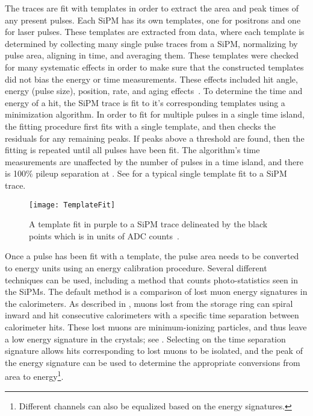 The traces are fit with templates in order to extract the area and peak times of any present pulses. Each SiPM has its own templates, one for positrons and one for laser pulses. These templates are extracted from data, where each template is determined by collecting many single pulse traces from a SiPM, normalizing by pulse area, aligning in time, and averaging them. These templates were checked for many systematic effects in order to make sure that the constructed templates did not bias the energy or time measurements. These effects included hit angle, energy (pulse size), position, rate, and aging effects~\cite{Kaspar:2016ofv,AFThesis}. To determine the time and energy of a hit, the SiPM trace is fit to it's corresponding templates using a \chisq minimization algorithm. In order to fit for multiple pulses in a single time island, the fitting procedure first fits with a single template, and then checks the residuals for any remaining peaks. If peaks above a threshold are found, then the fitting is repeated until all pulses have been fit. The algorithm's time measurements are unaffected by the number of pulses in a time island, and there is 100\% pileup separation at . See  for a typical single template fit to a SiPM trace.


\begin{figure}
    \centering
    \texttt{[image: TemplateFit]}
    \caption[Template fit to SiPM trace]{A template fit in purple to a SiPM trace delineated by the black points which is in units of ADC counts~\cite{AFThesis}.}
    \label{fig:TemplateFit}
\end{figure}


Once a pulse has been fit with a template, the pulse area needs to be converted to energy units using an energy calibration procedure. Several different techniques can be used, including a method that counts photo-statistics seen in the SiPMs. The default method is a comparison of lost muon energy signatures in the calorimeters. As described in , muons lost from the storage ring can spiral inward and hit consecutive calorimeters with a specific time separation between calorimeter hits. These lost muons are minimum-ionizing particles, and thus leave a low energy signature in the crystals; see . Selecting on the time separation signature allows hits corresponding to lost muons to be isolated, and the peak of the energy signature can be used to determine the appropriate conversions from area to energy\footnote{Different channels can also be equalized based on the energy signatures.}. 


